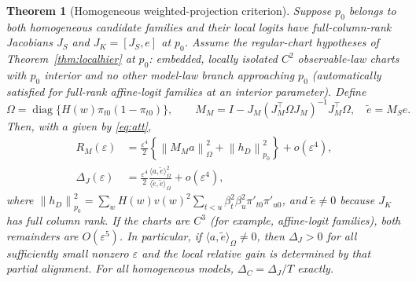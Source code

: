 \documentclass[11pt,letterpaper]{article}
\theoremstyle{plain}
\newtheorem{theorem}{Theorem}[section]
\theoremstyle{definition}
\newcommand{\norm}[1]{\left\|#1\right\|}
\begin{document}
\begin{theorem}[Homogeneous weighted-projection criterion]\label{thm:wls}
Suppose $p_0$ belongs to both homogeneous candidate families and their local logits have full-column-rank Jacobians $J_S$ and $J_K=[J_S,e]$ at $p_0$. Assume the regular-chart hypotheses of Theorem~\ref{thm:localhier} at $p_0$: embedded, locally isolated $C^2$ observable-law charts with $p_0$ interior and no other model-law branch approaching $p_0$ (automatically satisfied for full-rank affine-logit families at an interior parameter). Define
\[
\Omega=\operatorname{diag}\{H(w)\pi_{t0}(1-\pi_{t0})\},\qquad
M_M=I-J_M(J_M^\top\Omega J_M)^{-1}J_M^\top\Omega,
\quad \tilde e=M_Se.
\]
Then, with $a$ given by \eqref{eq:att},
\begin{align}\label{eq:localrisk}
R_M(\varepsilon)&=\frac{\varepsilon^4}{2}\left\{\norm{M_Ma}_\Omega^2+\norm{h_D}_{p_0}^2\right\}+o(\varepsilon^4),\\
\Delta_J(\varepsilon)&=\frac{\varepsilon^4}{2}\frac{\langle a,\tilde e\rangle_\Omega^2}{\langle\tilde e,\tilde e\rangle_\Omega}+o(\varepsilon^4),\label{eq:wls}
\end{align}
where $\norm{h_D}_{p_0}^2=\sum_wH(w)v(w)^2\sum_{t<u}\beta_t^2\beta_u^2\pi'_{t0}\pi'_{u0}$, and $\tilde e\ne0$ because $J_K$ has full column rank. If the charts are $C^3$ (for example, affine-logit families), both remainders are $O(\varepsilon^5)$. In particular, if $\langle a,\tilde e\rangle_\Omega\ne0$, then $\Delta_J>0$ for all sufficiently small nonzero $\varepsilon$ and the local relative gain is determined by that partial alignment. For all homogeneous models, $\Delta_C=\Delta_J/T$ exactly.
\end{theorem}
\end{document}
